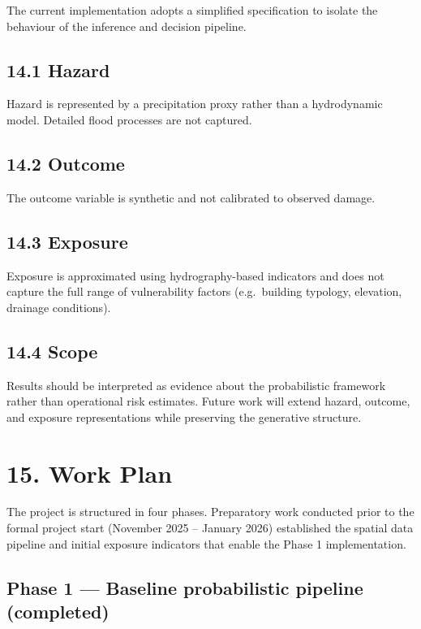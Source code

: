 \documentclass[
]{article}
\begin{document}
The current implementation adopts a simplified specification to isolate
the behaviour of the inference and decision pipeline.

\subsection{14.1 Hazard}\label{hazard}

Hazard is represented by a precipitation proxy rather than a
hydrodynamic model. Detailed flood processes are not captured.

\subsection{14.2 Outcome}\label{outcome}

The outcome variable is synthetic and not calibrated to observed damage.

\subsection{14.3 Exposure}\label{exposure}

Exposure is approximated using hydrography-based indicators and does not
capture the full range of vulnerability factors (e.g.~building typology,
elevation, drainage conditions).

\subsection{14.4 Scope}\label{scope-1}

Results should be interpreted as evidence about the probabilistic
framework rather than operational risk estimates. Future work will
extend hazard, outcome, and exposure representations while preserving
the generative structure.

\section{15. Work Plan}\label{work-plan}

The project is structured in four phases. Preparatory work conducted
prior to the formal project start (November 2025 -- January 2026)
established the spatial data pipeline and initial exposure indicators
that enable the Phase 1 implementation.

\subsection{Phase 1 --- Baseline probabilistic pipeline
(completed)}\label{phase-1-baseline-probabilistic-pipeline-completed}
\end{document}
